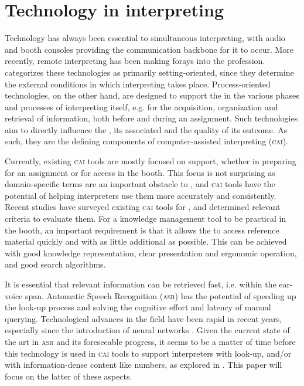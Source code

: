 \documentclass[output=paper]{langsci/langscibook}
\begin{document}
\section{Technology in interpreting}\largerpage[-1]

Technology has always been essential to simultaneous interpreting, with audio  and booth consoles providing the communication backbone for it to occur. More recently, remote interpreting has been making forays into the profession. \citet{Fantinuoli2018} categorizes these technologies as primarily setting-ori\-ented, since they determine the external conditions in which interpreting takes place. Process-oriented technologies, on the other hand, are designed to support the  in the various phases and processes of interpreting itself, e.g. for the acquisition, organization and retrieval of information, both before and during an assignment. Such technologies aim to directly influence the , its associated  and the quality of its outcome. As such, they are the defining components of computer-assisted interpreting (\textsc{cai}).

Currently, existing \textsc{cai} tools are mostly focused on  support, whether in preparing for an assignment or for access in the booth. This focus is not surprising as domain-specific terms are an important obstacle to , and \textsc{cai} tools have the potential of helping interpreters use them more accurately and consistently. Recent studies \citep{Will2015,Fantinuoli2017a,Costa2018} have surveyed existing \textsc{cai} tools for , and determined relevant criteria to evaluate them. For a knowledge management tool to be practical in the booth, an important requirement is that it allows the  to access reference material quickly and with as little additional  as possible. This can be achieved with good knowledge representation, clear presentation and ergonomic operation, and good search algorithms.

It is essential that relevant information can be retrieved fast, i.e. within the ear-voice span. Automatic Speech Recognition (\textsc{asr}) has the potential of speeding up the look-up process and solving the cognitive effort and latency of manual querying. Technological advances in the field have been rapid in recent years, especially since the introduction of neural networks \citep{Yu2016}. Given the current state of the art in \textsc{asr} and its foreseeable progress, it seems to be a matter of time before this technology is used in \textsc{cai} tools to support interpreters with  look-up, and/or with information-dense content like numbers, as explored in \citet{Fantinuoli2017b}. This paper will focus on the latter of these aspects. 
\end{document}
